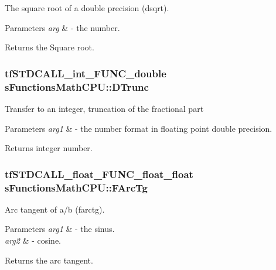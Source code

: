 The square root of a double precision (dsqrt). 
\begin{DoxyParams}{Parameters}
{\em arg} & -\/ the number. \\
\hline
\end{DoxyParams}
\begin{DoxyReturn}{Returns}
the Square root. 
\end{DoxyReturn}
\hypertarget{structs_functions_math_c_p_u_a074411055b96fed599954c5f34c22d26}{
\subsubsection[{D\-Trunc}]{\setlength{\rightskip}{0pt plus 5cm}tf\-S\-T\-D\-C\-A\-L\-L\-\_\-int\-\_\-\-F\-U\-N\-C\-\_\-double s\-Functions\-Math\-C\-P\-U\-::\-D\-Trunc}}\label{structs_functions_math_c_p_u_a074411055b96fed599954c5f34c22d26}
Transfer to an integer, truncation of the fractional part 
\begin{DoxyParams}{Parameters}
{\em arg1} & -\/ the number format in floating point double precision. \\
\hline
\end{DoxyParams}
\begin{DoxyReturn}{Returns}
integer number. 
\end{DoxyReturn}
\hypertarget{structs_functions_math_c_p_u_aa6c04010f7c30ddc2ec9df0a087a9ff9}{
\subsubsection[{F\-Arc\-Tg}]{\setlength{\rightskip}{0pt plus 5cm}tf\-S\-T\-D\-C\-A\-L\-L\-\_\-float\-\_\-\-F\-U\-N\-C\-\_\-float\-\_\-float s\-Functions\-Math\-C\-P\-U\-::\-F\-Arc\-Tg}}\label{structs_functions_math_c_p_u_aa6c04010f7c30ddc2ec9df0a087a9ff9}
Arc tangent of a/b (farctg). 
\begin{DoxyParams}{Parameters}
{\em arg1} & -\/ the sinus. \\
\hline
{\em arg2} & -\/ cosine. \\
\hline
\end{DoxyParams}
\begin{DoxyReturn}{Returns}
the arc tangent. 
\end{DoxyReturn}

